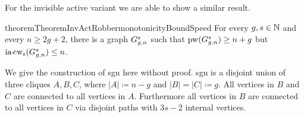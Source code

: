 For the invisible active variant we are able to show a similar result.
\begin{restatable}{theorem}{TheoremInvActRobbermonotonicityBoundSpeed}
	\label{TheoremInvActRobbermonotonicityBoundSpeed}
	For every $g,s\in\N$ and every $n\geq 2g+2$, there is a graph $\iaNonMon sgn$ such that $\pw(\iaNonMon sgn)\geq n+g$ but $\iacopwidth{s}(\iaNonMon sgn)\leq n$.
\end{restatable}
We give the construction of \iaNonMon sgn here without proof.
\iaNonMon sgn is a disjoint union of three cliques $A,B,C$, where $|A|\coloneqq n-g$ and $|B|=|C| \coloneqq g$.
All vertices in $B$ and $C$ are connected to all vertices in $A$.
Furthermore all vertices in $B$ are connected to all vertices in $C$ via disjoint paths with $3s-2$ internal vertices.